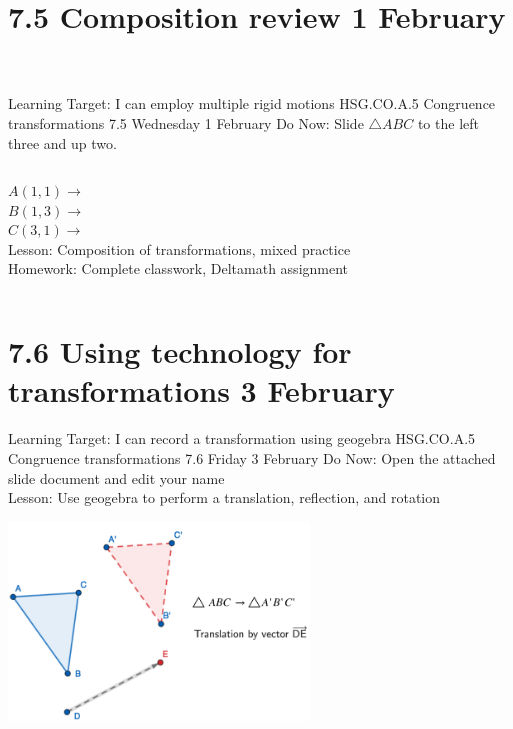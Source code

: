 \section{7.5 Composition review \hfill 1 February \,}
\begin{frame}{Learning Target: I can employ multiple rigid motions}
  {HSG.CO.A.5 Congruence transformations \hfill \alert{7.5 Wednesday 1 February}}
  Do Now: Slide $\triangle ABC$ to the left three and up two.  \vspace{0.5cm}
  \begin{columns}
    $A(1,1) \rightarrow$ \\[0.3cm]
    $B(1,3) \rightarrow$ \\[0.3cm]
    $C(3,1) \rightarrow$ \\[0.3cm]
    Lesson: Composition of transformations, mixed practice \\[0.5cm]
    Homework: Complete classwork, Deltamath assignment
    \begin{flushright}
    \end{flushright}
  \end{columns}
\end{frame}

\section{7.6 Using technology for transformations \hfill 3 February \,}
\begin{frame}{Learning Target: I can record a transformation using geogebra}
  {HSG.CO.A.5 Congruence transformations \hfill \alert{7.6 Friday 3 February}}
  Do Now: Open the attached slide document and edit your name \\
  Lesson: Use geogebra to perform a translation, reflection, and rotation \\
  \begin{center}
    \includegraphics[width=8cm]{../graphics/7-6Geogebra.png}
  \end{center}
\end{frame}

